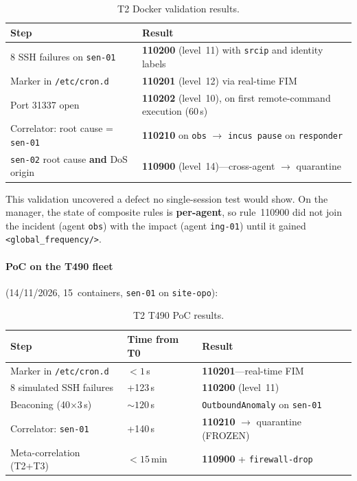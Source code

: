 \documentclass[11pt,a4paper]{article}
\begin{document}
\begin{table}[H]
  \centering
  \caption{T2 Docker validation results.}
  \small
  \begin{tabular}{@{}p{4cm}p{9cm}@{}}
    \toprule
    \textbf{Step} & \textbf{Result} \\
    \midrule
    8 SSH failures on \texttt{sen-01} &
      \textbf{110200} (level~11) with \texttt{srcip} and identity labels \\
    Marker in \texttt{/etc/cron.d} &
      \textbf{110201} (level~12) via real-time FIM \\
    Port 31337 open &
      \textbf{110202} (level~10), on first remote-command execution (60\,s) \\
    Correlator: root cause = \texttt{sen-01} &
      \textbf{110210} on \texttt{obs} $\to$ \texttt{incus pause} on \texttt{responder} \\
    \texttt{sen-02} root cause \textbf{and} DoS origin &
      \textbf{110900} (level~14)---cross-agent $\to$ quarantine \\
    \bottomrule
  \end{tabular}
\end{table}

This validation uncovered a defect no single-session test would show. On the manager, the
state of composite rules is \textbf{per-agent}, so rule~110900 did not join the incident
(agent \texttt{obs}) with the impact (agent \texttt{ing-01}) until it gained
\texttt{<global\_frequency/>}.

\paragraph{PoC on the T490 fleet} (14/11/2026, 15~containers, \texttt{sen-01} on \texttt{site-opo}):

\begin{table}[H]
  \centering
  \caption{T2 T490 PoC results.}
  \small
  \begin{tabular}{@{}p{4.5cm}lp{5.5cm}@{}}
    \toprule
    \textbf{Step} & \textbf{Time from T0} & \textbf{Result} \\
    \midrule
    Marker in \texttt{/etc/cron.d} & $<1$\,s &
      \textbf{110201}---real-time FIM \\
    8 simulated SSH failures & +123\,s &
      \textbf{110200} (level~11) \\
    Beaconing (40$\times$3\,s) & ${\sim}120$\,s &
      \texttt{OutboundAnomaly} on \texttt{sen-01} \\
    Correlator: \texttt{sen-01} & +140\,s &
      \textbf{110210} $\to$ quarantine (FROZEN) \\
    Meta-correlation (T2+T3) & $<15$\,min &
      \textbf{110900} + \texttt{firewall-drop} \\
    \bottomrule
  \end{tabular}
\end{table}
\end{document}
